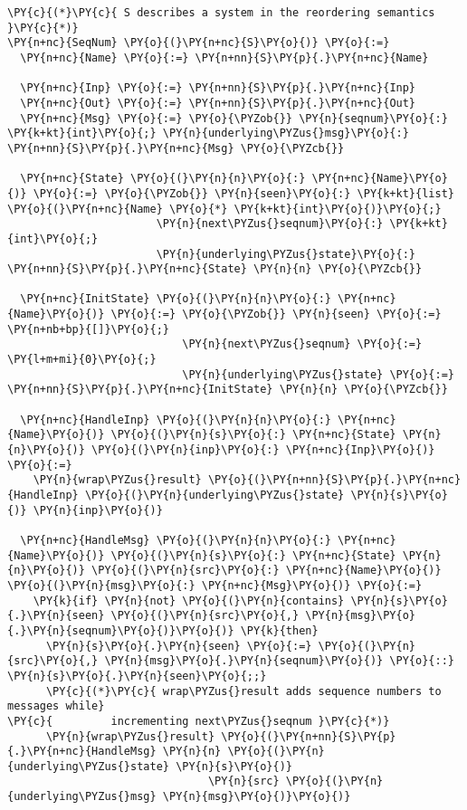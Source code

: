 \begin{Verbatim}[commandchars=\\\{\},codes={\catcode`\$=3\catcode`\^=7\catcode`\_=8}]
\PY{c}{(*}\PY{c}{ S describes a system in the reordering semantics }\PY{c}{*)}
\PY{n+nc}{SeqNum} \PY{o}{(}\PY{n+nc}{S}\PY{o}{)} \PY{o}{:=}
  \PY{n+nc}{Name} \PY{o}{:=} \PY{n+nn}{S}\PY{p}{.}\PY{n+nc}{Name}

  \PY{n+nc}{Inp} \PY{o}{:=} \PY{n+nn}{S}\PY{p}{.}\PY{n+nc}{Inp}
  \PY{n+nc}{Out} \PY{o}{:=} \PY{n+nn}{S}\PY{p}{.}\PY{n+nc}{Out}
  \PY{n+nc}{Msg} \PY{o}{:=} \PY{o}{\PYZob{}} \PY{n}{seqnum}\PY{o}{:} \PY{k+kt}{int}\PY{o}{;} \PY{n}{underlying\PYZus{}msg}\PY{o}{:} \PY{n+nn}{S}\PY{p}{.}\PY{n+nc}{Msg} \PY{o}{\PYZcb{}}

  \PY{n+nc}{State} \PY{o}{(}\PY{n}{n}\PY{o}{:} \PY{n+nc}{Name}\PY{o}{)} \PY{o}{:=} \PY{o}{\PYZob{}} \PY{n}{seen}\PY{o}{:} \PY{k+kt}{list} \PY{o}{(}\PY{n+nc}{Name} \PY{o}{*} \PY{k+kt}{int}\PY{o}{)}\PY{o}{;}
                       \PY{n}{next\PYZus{}seqnum}\PY{o}{:} \PY{k+kt}{int}\PY{o}{;}
                       \PY{n}{underlying\PYZus{}state}\PY{o}{:} \PY{n+nn}{S}\PY{p}{.}\PY{n+nc}{State} \PY{n}{n} \PY{o}{\PYZcb{}}

  \PY{n+nc}{InitState} \PY{o}{(}\PY{n}{n}\PY{o}{:} \PY{n+nc}{Name}\PY{o}{)} \PY{o}{:=} \PY{o}{\PYZob{}} \PY{n}{seen} \PY{o}{:=} \PY{n+nb+bp}{[]}\PY{o}{;}
                           \PY{n}{next\PYZus{}seqnum} \PY{o}{:=} \PY{l+m+mi}{0}\PY{o}{;}
                           \PY{n}{underlying\PYZus{}state} \PY{o}{:=} \PY{n+nn}{S}\PY{p}{.}\PY{n+nc}{InitState} \PY{n}{n} \PY{o}{\PYZcb{}}

  \PY{n+nc}{HandleInp} \PY{o}{(}\PY{n}{n}\PY{o}{:} \PY{n+nc}{Name}\PY{o}{)} \PY{o}{(}\PY{n}{s}\PY{o}{:} \PY{n+nc}{State} \PY{n}{n}\PY{o}{)} \PY{o}{(}\PY{n}{inp}\PY{o}{:} \PY{n+nc}{Inp}\PY{o}{)} \PY{o}{:=}
    \PY{n}{wrap\PYZus{}result} \PY{o}{(}\PY{n+nn}{S}\PY{p}{.}\PY{n+nc}{HandleInp} \PY{o}{(}\PY{n}{underlying\PYZus{}state} \PY{n}{s}\PY{o}{)} \PY{n}{inp}\PY{o}{)}

  \PY{n+nc}{HandleMsg} \PY{o}{(}\PY{n}{n}\PY{o}{:} \PY{n+nc}{Name}\PY{o}{)} \PY{o}{(}\PY{n}{s}\PY{o}{:} \PY{n+nc}{State} \PY{n}{n}\PY{o}{)} \PY{o}{(}\PY{n}{src}\PY{o}{:} \PY{n+nc}{Name}\PY{o}{)} \PY{o}{(}\PY{n}{msg}\PY{o}{:} \PY{n+nc}{Msg}\PY{o}{)} \PY{o}{:=}
    \PY{k}{if} \PY{n}{not} \PY{o}{(}\PY{n}{contains} \PY{n}{s}\PY{o}{.}\PY{n}{seen} \PY{o}{(}\PY{n}{src}\PY{o}{,} \PY{n}{msg}\PY{o}{.}\PY{n}{seqnum}\PY{o}{)}\PY{o}{)} \PY{k}{then}
      \PY{n}{s}\PY{o}{.}\PY{n}{seen} \PY{o}{:=} \PY{o}{(}\PY{n}{src}\PY{o}{,} \PY{n}{msg}\PY{o}{.}\PY{n}{seqnum}\PY{o}{)} \PY{o}{::} \PY{n}{s}\PY{o}{.}\PY{n}{seen}\PY{o}{;;}
      \PY{c}{(*}\PY{c}{ wrap\PYZus{}result adds sequence numbers to messages while}
\PY{c}{         incrementing next\PYZus{}seqnum }\PY{c}{*)}
      \PY{n}{wrap\PYZus{}result} \PY{o}{(}\PY{n+nn}{S}\PY{p}{.}\PY{n+nc}{HandleMsg} \PY{n}{n} \PY{o}{(}\PY{n}{underlying\PYZus{}state} \PY{n}{s}\PY{o}{)}
                               \PY{n}{src} \PY{o}{(}\PY{n}{underlying\PYZus{}msg} \PY{n}{msg}\PY{o}{)}\PY{o}{)}
\end{Verbatim}
